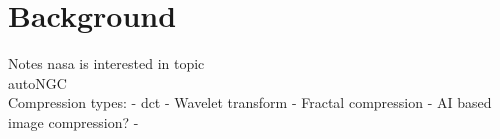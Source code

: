 \section{Background} \label{sec:background}
Notes
\gls{nasa} is interested in topic\\
autoNGC\\

Compression types:
    - \gls{dct}
    - Wavelet transform
    - Fractal compression
    - AI based image compression?
    - 